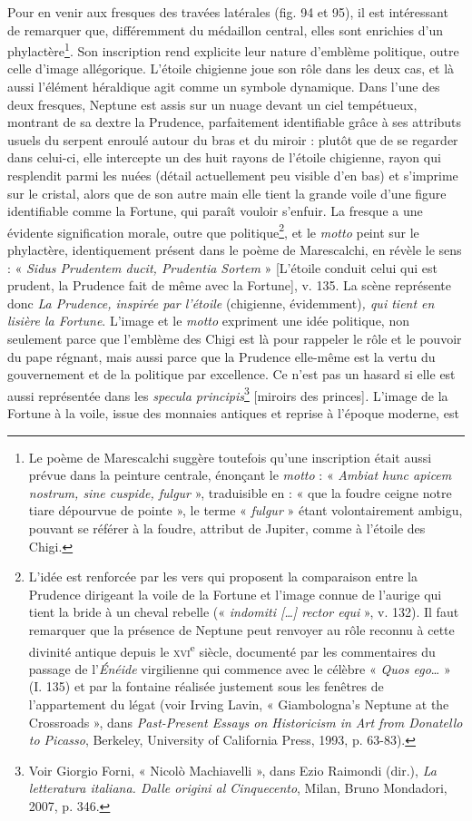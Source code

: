 \documentclass[12pt,twoside,openany]{book}
\begin{document}
Pour en venir aux fresques des travées latérales (fig. 94 et 95), il est intéressant de remarquer que, différemment du médaillon central, elles sont enrichies d’un phylactère\footnote{Le poème de Marescalchi suggère toutefois qu’une inscription était aussi prévue dans la peinture centrale, énonçant le \textit{motto} : « \textit{Ambiat hunc apicem nostrum, sine cuspide, fulgur} », traduisible en : « que la foudre ceigne notre tiare dépourvue de pointe », le terme « \textit{fulgur} » étant volontairement ambigu, pouvant se référer à la foudre, attribut de Jupiter, comme à l’étoile des Chigi.}. Son inscription rend explicite leur nature d’emblème politique, outre celle d’image allégorique. L’étoile chigienne joue son rôle dans les deux cas, et là aussi l’élément héraldique agit comme un symbole dynamique. Dans l’une des deux fresques, Neptune est assis sur un nuage devant un ciel tempétueux, montrant de sa dextre la Prudence, parfaitement identifiable grâce à ses attributs usuels du serpent enroulé autour du bras et du miroir : plutôt que de se regarder dans celui-ci, elle intercepte un des huit rayons de l’étoile chigienne, rayon qui resplendit parmi les nuées (détail actuellement peu visible d’en bas) et s’imprime sur le cristal, alors que de son autre main elle tient la grande voile d’une figure identifiable comme la Fortune, qui paraît vouloir s’enfuir. La fresque a une évidente signification morale, outre que politique\footnote{L’idée est renforcée par les vers qui proposent la comparaison entre la Prudence dirigeant la voile de la Fortune et l’image connue de l’aurige qui tient la bride à un cheval rebelle (« \textit{indomiti […] rector equi} », v. 132). Il faut remarquer que la présence de Neptune peut renvoyer au rôle reconnu à cette divinité antique depuis le \textsc{xvi}\textsuperscript{e} siècle, documenté par les commentaires du passage de l’\textit{Énéide }virgilienne qui commence avec le célèbre « \textit{Quos ego}… » (I. 135) et par la fontaine réalisée justement sous les fenêtres de l’appartement du légat (voir Irving Lavin, « Giambologna’s Neptune at the Crossroads », dans \textit{Past-Present Essays on Historicism in Art from Donatello to Picasso}, Berkeley, University of California Press, 1993, p. 63-83).}, et le \textit{motto} peint sur le phylactère, identiquement présent dans le poème de Marescalchi, en révèle le sens : « \textit{Sidus Prudentem ducit, Prudentia Sortem} » [L’étoile conduit celui qui est prudent, la Prudence fait de même avec la Fortune], v. 135. La scène représente donc \textit{La Prudence, inspirée par l’étoile }(chigienne, évidemment)\textit{, qui tient en lisière la Fortune}. L’image et le \textit{motto} expriment une idée politique, non seulement parce que l’emblème des Chigi est là pour rappeler le rôle et le pouvoir du pape régnant, mais aussi parce que la Prudence elle-même est la vertu du gouvernement et de la politique par excellence. Ce n’est pas un hasard si elle est aussi représentée dans les \textit{specula principis}\footnote{Voir Giorgio Forni, « Nicolò Machiavelli », dans Ezio Raimondi (dir.), \textit{La letteratura italiana. Dalle origini al Cinquecento}, Milan, Bruno Mondadori, 2007, p. 346.} [miroirs des princes]\textit{. }L’image de la Fortune à la voile, issue des monnaies antiques et reprise à l’époque moderne, est 
\end{document}
